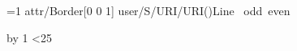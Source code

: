  
\vsize=100pt \parskip=0pt \baselineskip=12pt
\def\l#1{\leavevmode\pdfstartlink attr{/Border[0 0 1]} user{/S/URI/URI(#1)}Line #1\pdfendlink
  \ifodd\pdflastlink\ odd\else\ even\fi\par}
=1
\loop \l{\the\count1}\advance{} by 1 \ifnum{}<25 \repeat
\bye
